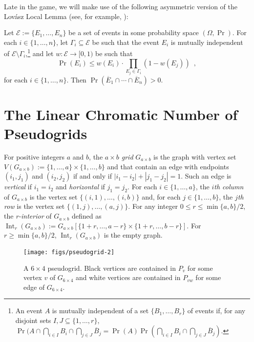 \documentclass{patmorin}
\DeclareMathOperator{\interior}{Int}
\newcommand{\defin}[1]{\emph{\color{brightmaroon}#1}}
\begin{document}
Late in the game, we will make use of the following asymmetric version of the Lovász Local Lemma (see, for example, \citet[Lemma~5.1.1]{alon.spencer:probabilistic}):

\begin{lem}\label{weighted_lovasz}
  Let $\mathcal{E}:=\{E_1,\ldots,E_n\}$ be a set of events in some probability space $(\Omega,\Pr)$.  For each $i\in\{1,\ldots,n\}$, let $\Gamma_i\subseteq \mathcal{E}$ be such that the event $E_i$ is mutually independent of $\mathcal{E}\setminus \Gamma_i$,\footnote{An event $A$ is mutually independent of a set $\{B_1,\ldots,B_r\}$ of events if, for any disjoint sets $I,J\subseteq\{1,\ldots,r\}$, $\Pr(A\cap\bigcap_{i\in I} B_i\cap\bigcap_{j\in J} \overline{B}_j=\Pr(A)\Pr(\bigcap_{i\in I} B_i\cap\bigcap_{j\in J} \overline{B}_j)$.} and let $w:\mathcal{E}\to[0,1)$ be such that
  \[
      \Pr(E_i) \le w(E_i)\cdot\prod_{E_j\in\Gamma_i}(1-w(E_j))  \enspace ,
  \]
  for each $i\in\{1,\ldots,n\}$.
  Then $\Pr(\overline{E}_1\cap\cdots\cap\overline{E}_n) > 0$.
\end{lem}


\section{The Linear Chromatic Number of Pseudogrids}

For positive integers $a$ and $b$, the \defin{$a\times b$ grid} $G_{a\times b}$ is the graph with vertex set $V(G_{a\times b}):=\{1,\ldots,a\}\times\{1,\ldots,b\}$ and that contain an edge with endpoints $(i_1,j_1)$ and $(i_2,j_2)$ if and only if $|i_1-i_2|+|j_1-j_2|=1$.  Such an edge is \defin{vertical} if $i_1=i_2$ and \defin{horizontal} if $j_1=j_2$.  For each $i\in\{1,\ldots,a\}$, the \defin{$i$th column} of $G_{a\times b}$ is the vertex set $\{(i,1),\ldots,(i,b)\}$ and, for each $j\in\{1,\ldots,b\}$, the \defin{$j$th row} is the vertex set $\{(1,j),\ldots,(a,j)\}$.  For any integer $0\le r\le\min\{a,b\}/2$, the \defin{r-interior} of $G_{a\times b}$ defined as $\interior_r(G_{a\times b}):=G_{a\times b}[\{1+r,\ldots,a-r\}\times\{1+r,\ldots,b-r\}]$.  For $r\ge\min\{a,b\}/2$, $\interior_r(G_{a\times b})$ is the empty graph.

\begin{figure}
  \begin{center}
    \texttt{[image: figs/pseudogrid-2]}
  \end{center}
  \caption{A $6\times 4$ pseudogrid.  Black vertices are contained in $P_v$ for some vertex $v$ of $G_{6\times 4}$ and white vertices are contained in $P_{vw}$ for some edge of $G_{6\times 4}$.}
  \label{pseudogrid_fig}
\end{figure}
\end{document}
